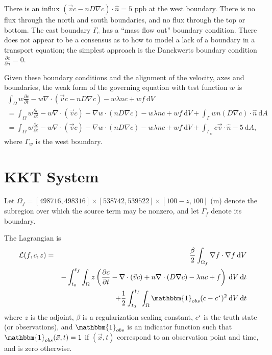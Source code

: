 \documentclass[12pt, letterpaper]{article}
\newcommand{\dA}{{\:\textrm{d}A}}
\newcommand{\dV}{{\:\textrm{d}V}}
\newcommand{\dt}{{\:\textrm{d}t}}
\begin{document}
There is an influx $(\vec{v}c-nD\nabla c)\cdot\hat{n}=5\textrm{ ppb}$ at the west boundary. There is no flux through the north and south boundaries, and no flux through the top or bottom. The east boundary $\Gamma_e$ has a ``mass flow out'' boundary condition. There does not appear to be a consensus as to how to model a lack of a boundary in a transport equation; the simplest approach is the Danckwerts boundary condition $\frac{\partial c}{\partial n}=0$. 

Given these boundary conditions and the alignment of the velocity, axes and boundaries, the weak form of the governing equation with test function $w$ is
\begin{multline*}
\int_\Omega w\frac{\partial c}{\partial t} - w\nabla\cdot(\vec{v}c - nD\nabla c) - w\lambda nc + wf \dV \\
= \int_\Omega w\frac{\partial c}{\partial t} - w\nabla\cdot(\vec{v}c) - \nabla w\cdot (nD\nabla c) - w\lambda nc + wf \dV + \int_\Gamma wn(D\nabla c)\cdot\hat{n} \dA\\
= \int_\Omega w\frac{\partial c}{\partial t} - w\nabla\cdot(\vec{v}c) - \nabla w\cdot (nD\nabla c) - w\lambda nc + wf \dV + \int_{\Gamma_w} c\vec{v}\cdot\hat{n}-5 \dA,
\end{multline*}
where $\Gamma_w$ is the west boundary.

\section{KKT System}

Let $\Omega_f=[498716,498316]\times[538742,539522]\times[100-z,100]$ (m) denote the subregion over which the source term may be nonzero, and let $\Gamma_f$ denote its boundary.

The Lagrangian is
\begin{eqnarray*}
\mathcal{L}(f,c,z) &=& \frac{\beta}{2}\int_{\Omega_f}\nabla f\cdot\nabla f\dV \\
&& -\int_{t_0}^{t_f}\int_\Omega z\left(\frac{\partial c}{\partial t}-\nabla\cdot(\vec{v}c)+n\nabla\cdot (D\nabla c)-\lambda n c + f\right)\dV\dt \\
&& +\frac{1}{2}\int_{t_0}^{t_f}\int_\Omega \mathbbm{1}_{obs}(c-c^\star)^2 \dV\dt
\end{eqnarray*}
where $z$ is the adjoint, $\beta$ is a regularization scaling constant, $c^\star$ is the truth state (or observations), and $\mathbbm{1}_{obs}$ is an indicator function such that $\mathbbm{1}_{obs}(\vec{x},t)=1$ if $(\vec{x},t)$ correspond to an observation point and time, and is zero otherwise.
\end{document}
